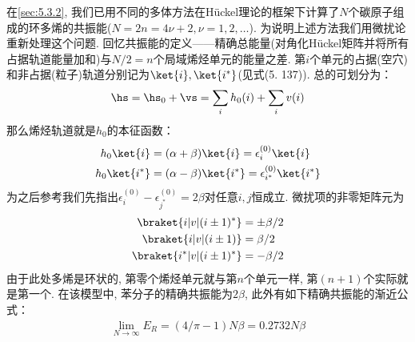 在\autoref{sec:5.3.2}, 
我们已用不同的多体方法在H\"uckel理论的框架下计算了$N$个碳原子组成的环多烯的共振能($N=2n=4\nu +2,\nu=1,2,\ldots$). 
为说明上述方法我们用微扰论重新处理这个问题. 
回忆共振能的定义——精确总能量(对角化H\"uckel矩阵并将所有占据轨道能量加和)与$N/2=n$个局域烯烃单元的能量之差. 
第$i$个单元的占据(空穴)和非占据(粒子)轨道分别记为$\ket{i},\ket{i^*}$(见式(5.
137)). 
总的\ha 可划分为：
\begin{align}
\hs = \hs_0 + \vs = \sum_ih_0(i) + \sum_iv(i)
\end{align}
那么烯烃轨道就是$h_0$的本征函数：
\begin{subequations}\label{6.46}
	\begin{align}
	h_0\ket{i} &= (\alpha+\beta)\ket{i} = \epsilon_i^{(0)}\ket{i}\\
	h_0\ket{i^*} &= (\alpha-\beta)\ket{i^*} = \epsilon_{i^*}^{(0)}\ket{i^*}
	\end{align}
\end{subequations}
为之后参考我们先指出$\epsilon_i^{(0)} - \epsilon^{(0)}_{j^*}=2\beta$对任意$i,j$恒成立. 
微扰项的非零矩阵元为
\begin{subequations}\label{6.47}
	\begin{align}\label{6.47a}
	\braket{i|v|(i\pm 1)^*} & = \pm\beta/2\\\label{6.47b}
	\braket{i|v|(i\pm 1)} & = \beta/2\\\label{6.47c}
	\braket{i^*|v|(i\pm 1)^*} & = -\beta/2
	\end{align}
\end{subequations}
由于此处多烯是环状的, 
第零个烯烃单元就与第$n$个单元一样, 
第$(n+1)$个实际就是第一个. 
在该模型中, 
苯分子的精确共振能为$2\beta$, 
此外有如下精确共振能的渐近公式：
\begin{align}\label{6.48}
\lim\limits_{N\to\infty}E_R = (4/\pi-1)N\beta=0.2732N\beta
\end{align}

